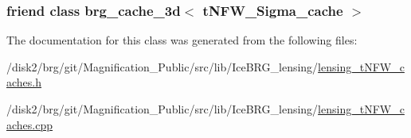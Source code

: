 \subsubsection[{brg\+\_\+cache\+\_\+3d$<$ t\+N\+F\+W\+\_\+\+Sigma\+\_\+cache $>$}]{\setlength{\rightskip}{0pt plus 5cm}friend class {\bf brg\+\_\+cache\+\_\+3d}$<$ {\bf t\+N\+F\+W\+\_\+\+Sigma\+\_\+cache} $>$\hspace{0.3cm}{\ttfamily [friend]}}\label{classIceBRG_1_1tNFW__Sigma__cache_a55fa430ea2bcfdde9110c10b1511d4d0}


The documentation for this class was generated from the following files\+:\begin{DoxyCompactItemize}
\item 
/disk2/brg/git/\+Magnification\+\_\+\+Public/src/lib/\+Ice\+B\+R\+G\+\_\+lensing/\hyperlink{lensing__tNFW__caches_8h}{lensing\+\_\+t\+N\+F\+W\+\_\+caches.\+h}\item 
/disk2/brg/git/\+Magnification\+\_\+\+Public/src/lib/\+Ice\+B\+R\+G\+\_\+lensing/\hyperlink{lensing__tNFW__caches_8cpp}{lensing\+\_\+t\+N\+F\+W\+\_\+caches.\+cpp}\end{DoxyCompactItemize}
